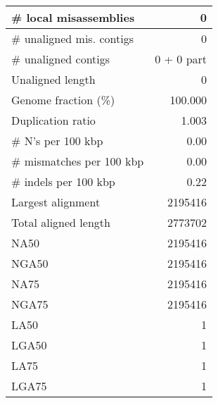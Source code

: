 \documentclass[12pt,a4paper]{article}
\begin{document}
\begin{table}[ht]
\begin{center}
\begin{tabular}{|l*{1}{|r}|}
\# local misassemblies & 0 \\ \hline
\# unaligned mis. contigs & 0 \\ \hline
\# unaligned contigs & 0 + 0 part \\ \hline
Unaligned length & 0 \\ \hline
Genome fraction (\%) & 100.000 \\ \hline
Duplication ratio & 1.003 \\ \hline
\# N's per 100 kbp & 0.00 \\ \hline
\# mismatches per 100 kbp & 0.00 \\ \hline
\# indels per 100 kbp & 0.22 \\ \hline
Largest alignment & 2195416 \\ \hline
Total aligned length & 2773702 \\ \hline
NA50 & 2195416 \\ \hline
NGA50 & 2195416 \\ \hline
NA75 & 2195416 \\ \hline
NGA75 & 2195416 \\ \hline
LA50 & 1 \\ \hline
LGA50 & 1 \\ \hline
LA75 & 1 \\ \hline
LGA75 & 1 \\ \hline
\end{tabular}
\end{center}
\end{table}
\end{document}

